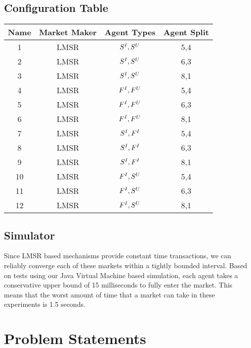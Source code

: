 \subsection{Configuration Table}
\begin{center}
 \begin{tabular}{||c c c c||} 
 Name & Market Maker & Agent Types & Agent Split \\ [0.5ex] 
 \hline\hline
 1 & LMSR & $S^I,S^U$ & 5,4 \\
 \hline
 2 & LMSR & $S^I,S^U$ & 6,3 \\
 \hline
 3 & LMSR & $S^I,S^U$ & 8,1 \\
\hline
 4 & LMSR & $F^I,F^U$ & 5,4 \\ 
 \hline
 5 & LMSR & $F^I,F^U$ & 6,3 \\ 
 \hline
 6 & LMSR & $F^I,F^U$ & 8,1 \\ 
 \hline
 7 & LMSR & $S^I,F^I$ & 5,4 \\ 
  \hline
 8 & LMSR & $S^I,F^I$ & 6,3 \\ 
  \hline
 9 & LMSR & $S^I,F^I$ & 8,1 \\ 
  \hline
 10 & LMSR & $F^I,S^U$ & 5,4 \\ 
  \hline
 11 & LMSR & $F^I,S^U$ & 6,3 \\ 
  \hline
 12 & LMSR & $F^I,S^U$ & 8,1 \\ 
 \hline
\end{tabular}
\end{center}

\subsection{Simulator}
Since LMSR based mechanisms provide constant time transactions, we can reliably converge each of these markets within a tightly bounded interval. Based on tests using our Java Virtual Machine based simulation, each agent takes a conservative upper bound of 15 milliseconds to fully enter the market. This means that the worst amount of time that a market can take in these experiments is 1.5 seconds.

\iffalse
\section{Problem Statements}
